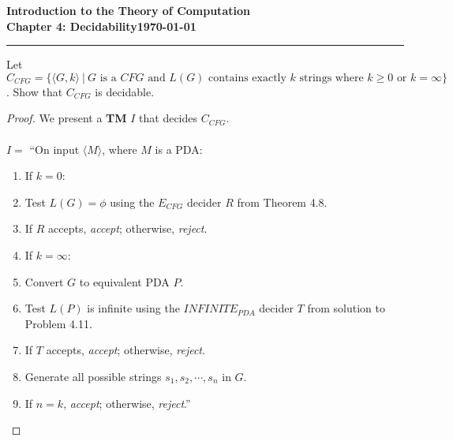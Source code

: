 \documentclass[11pt]{article}
\newcommand{\dated}{\today}
\begin{document}
\textbf{Introduction to the Theory of
Computation}\hfill\textbf{\myname}\\[0.01in]
\textbf{Chapter 4: Decidability}\hfill\textbf{\dated}\\
\smallskip\hrule\bigskip

\begin{problem}{4.29}
Let $C_{CFG} = \{\langle G, k \rangle \ | \ G \text{ is a } CFG \text{ and } L(G) \text{ contains exactly } k \text{ strings where } k \geq 0 \text{ or } k = \infty\}$. Show that $C_{CFG}$ is decidable.
\end{problem}

\begin{proof}
We present a \textbf{TM} $I$ that decides $C_{CFG}$.  \\
\\
$I =$ \textquotedblleft On input $\langle M \rangle$, where $M$ is a PDA:
\begin{enumerate}

\item If $k = 0$:
\item \hspace*{0.5cm} Test $L(G) = \phi$ using the $E_{CFG}$ decider $R$ from Theorem 4.8. 
\item \hspace*{0.5cm} If $R$ accepts, \textit{accept}; otherwise,  \textit{reject}.
\item If $k = \infty$:
\item \hspace*{0.5cm} Convert $G$ to equivalent PDA $P$.
\item \hspace*{0.5cm} Test $L(P)$ is infinite using the $INFINITE_{PDA}$ decider $T$ from solution to Problem 4.11. 
\item \hspace*{0.5cm} If $T$ accepts, \textit{accept}; otherwise,  \textit{reject}.
\item Generate all possible strings $s_1, s_2, \cdots, s_n$ in $G$.
\item If $n = k$, \textit{accept}; otherwise, \textit{reject}.\textquotedblright
\end{enumerate}
\end{proof}
\end{document}
